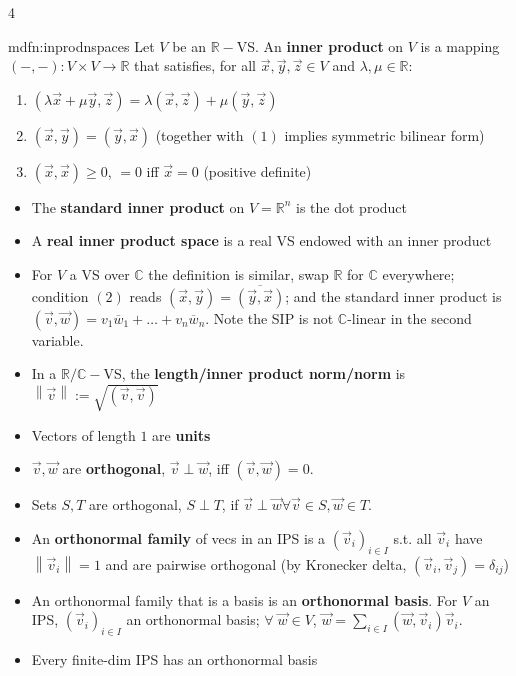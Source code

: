 \documentclass[landscape, 8pt]{extarticle}
\begin{document}
\begin{multicols*}{4}
		\begin{mdfn}{mdfn:inprodnspaces}{ }
			Let $V$ be an $\mathbb{R}-$VS. An \textbf{inner product} on $V$ is a mapping $(-, -): V \times V \to \mathbb{R}$ that satisfies, for all $\vec{x}, \vec{y}, \vec{z} \in V$ and $\lambda, \mu \in \mathbb{R}$:
			\begin{enumerate}[label=(\arabic*)]
				\item $(\lambda \vec{x} + \mu \vec{y}, \vec{z}) = \lambda(\vec{x}, \vec{z}) + \mu (\vec{y}, \vec{z})$
				\item $(\vec{x}, \vec{y}) = (\vec{y}, \vec{x})$ (together with $(1)$ implies symmetric bilinear form)
				\item $(\vec{x}, \vec{x}) \ge 0$, $=0$ iff $\vec{x} = 0$ (positive definite)
			\end{enumerate}
			\begin{itemize}
				\item The \textbf{standard inner product} on $V = \mathbb{R}^n$ is the dot product
				\item A \textbf{real inner product space} is a real VS endowed with an inner product
				\item For $V$ a VS over $\mathbb{C}$ the definition is similar, swap $\mathbb{R}$ for $\mathbb{C}$ everywhere; condition $(2)$ reads $(\vec{x}, \vec{y}) = \overline{(\vec{y}, \vec{x})}$; and the standard inner product is $(\vec{v}, \vec{w}) = v_1 \overline{w}_1 + \dots + v_n \overline{w}_n$. Note the SIP is not $\mathbb{C}$-linear in the second variable.
				\item In a $\mathbb{R}/\mathbb{C}-$VS, the \textbf{length/inner product norm/norm} is $\left\lVert \vec{v} \right\rVert := \sqrt{(\vec{v}, \vec{v})}$
				\item Vectors of length $1$ are \textbf{units}
				\item $\vec{v}, \vec{w}$ are \textbf{orthogonal}, $\vec{v} \perp \vec{w}$, iff $(\vec{v}, \vec{w}) = 0$. 
				\item Sets $S, T$ are orthogonal, $S \perp T$, if $\vec{v} \perp \vec{w} \forall \vec{v} \in S, \vec{w} \in T$.
				\item An \textbf{orthonormal family} of vecs in an IPS is a $(\vec{v}_i)_{i\in I}$ s.t. all $\vec{v}_i$ have $\left\lVert \vec{v}_i\right\rVert = 1$ and are pairwise orthogonal (by Kronecker delta, $(\vec{v}_i, \vec{v}_j) = \delta_{ij}$)
				\item An orthonormal family that is a basis is an \textbf{orthonormal basis}. For $V$ an IPS, $(\vec{v}_i)_{i \in I}$ an orthonormal basis; $\forall \; \vec{w} \in V$, $\vec{w} = \sum_{i \in I} (\vec{w}, \vec{v}_i)\vec{v}_i$.
				\item Every finite-dim IPS has an orthonormal basis
			\end{itemize}
			

\end{mdfn}
\end{multicols*}
\end{document}
